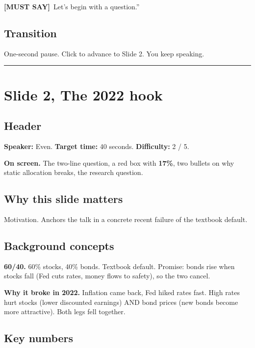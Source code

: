 \documentclass[11pt]{article}
\newcommand{\mustsay}[1]{\textcolor{must}{\textbf{[MUST SAY]}}\ #1}
\begin{document}
\mustsay{Let's begin with a question.''}

\subsection*{Transition}

One-second pause. Click to advance to Slide 2. You keep speaking.

\bigskip\hrule

\section*{Slide 2, The 2022 hook}

\subsection*{Header}

\textbf{Speaker:} Even. \quad\textbf{Target time:} 40 seconds. \quad\textbf{Difficulty:} 2 / 5.

\textbf{On screen.} The two-line question, a red box with \textbf{17\%}, two bullets on why static allocation breaks, the research question.

\subsection*{Why this slide matters}

Motivation. Anchors the talk in a concrete recent failure of the textbook default.

\subsection*{Background concepts}

\textbf{60/40.} 60\% stocks, 40\% bonds. Textbook default. Promise: bonds rise when stocks fall (Fed cuts rates, money flows to safety), so the two cancel.

\textbf{Why it broke in 2022.} Inflation came back, Fed hiked rates fast. High rates hurt stocks (lower discounted earnings) AND bond prices (new bonds become more attractive). Both legs fell together.

\subsection*{Key numbers}
\end{document}
